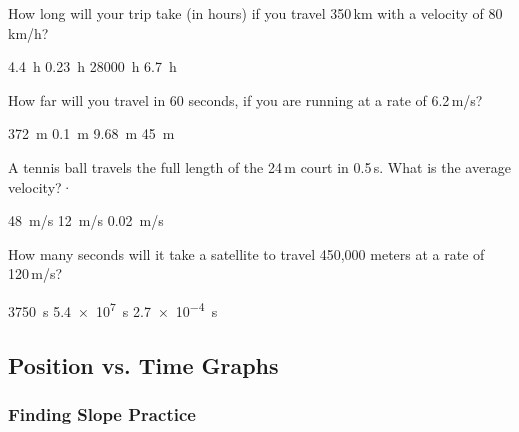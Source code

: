 \documentclass[]{exam}
\begin{document}
\begin{questions}
\question
How long will your trip take (in hours) if you travel 350\,km with a velocity of 80\,km/h?

\begin{randomizechoices}
    \correctchoice \SI{4.4}{h}
    \choice \SI{0.23}{h}
    \choice \SI{28000}{h}
    \choice \SI{6.7}{h}
\end{randomizechoices}

\ifprintanswers
\else
\clearpage
\fi

\question
How far will you travel in 60 seconds, if you are running at a rate of 6.2\,m/s?

\begin{randomizechoices}
    \correctchoice \SI{372}{m}
    \choice \SI{0.1}{m}
    \choice \SI{9.68}{m}
    \choice \SI{45}{m}
\end{randomizechoices}

\question
A tennis ball travels the full length of the 24\,m court in 0.5\,s. What is the average velocity?·

\begin{randomizechoices}
    \correctchoice \SI{48}{m/s}
    \choice \SI{12}{m/s}
    \choice \SI{0.02}{m/s}
\end{randomizechoices}

\question
How many seconds will it take a satellite to travel 450,000 meters at a rate of 120\,m/s?

\begin{randomizechoices}
    \correctchoice \SI{3750}{s}
    \choice \SI{5.4e7}{s}
    \choice \SI{2.7e-4}{s}
\end{randomizechoices}



\end{questions}

\clearpage

\subsection{Position vs. Time Graphs}

\subsubsection{Finding Slope Practice}
\end{document}
